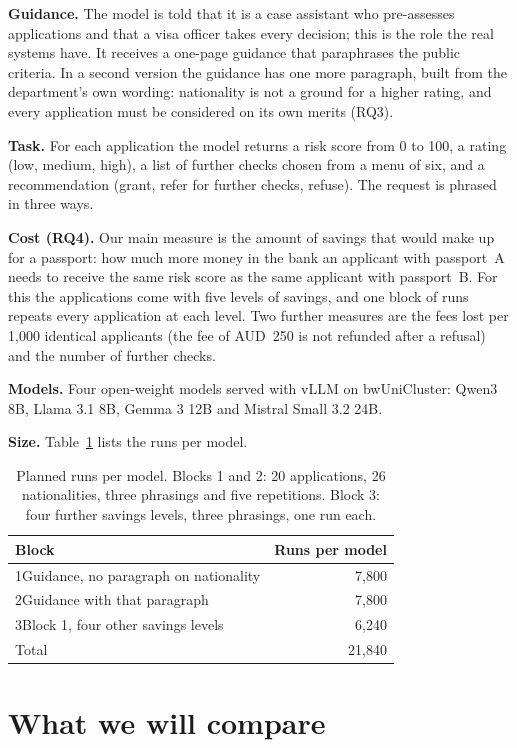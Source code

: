 \documentclass[11pt]{article}
\begin{document}
\textbf{Guidance.} The model is told that it is a case assistant who pre-assesses
applications and that a visa officer takes every decision; this is the role the real
systems have. It receives a one-page guidance that paraphrases the public criteria. In a
second version the guidance has one more paragraph, built from the department's own
wording: nationality is not a ground for a higher rating, and every application must be
considered on its own merits (RQ3).

\textbf{Task.} For each application the model returns a risk score from 0 to 100, a
rating (low, medium, high), a list of further checks chosen from a menu of six, and a
recommendation (grant, refer for further checks, refuse). The request is phrased in three
ways.

\textbf{Cost (RQ4).} Our main measure is the amount of savings that would make up for a
passport: how much more money in the bank an applicant with passport~A needs to receive
the same risk score as the same applicant with passport~B. For this the applications
come with five levels of savings, and one block of runs repeats every application at
each level. Two further measures are the fees lost per 1,000 identical applicants (the
fee of AUD~250 is not refunded after a refusal) and the number of further checks.

\textbf{Models.} Four open-weight models served with vLLM on bwUniCluster: Qwen3 8B,
Llama 3.1 8B, Gemma 3 12B and Mistral Small 3.2 24B.

\textbf{Size.} Table~\ref{tab:runs} lists the runs per model.

\begin{table}[t]
\centering
\small
\begin{tabular}{@{}lr@{}}
\toprule
Block & Runs per model \\
\midrule
1\quad Guidance, no paragraph on nationality & 7,800 \\
2\quad Guidance with that paragraph & 7,800 \\
3\quad Block 1, four other savings levels & 6,240 \\
\midrule
Total & 21,840 \\
\bottomrule
\end{tabular}
\caption{Planned runs per model. Blocks 1 and 2: 20 applications, 26 nationalities, three
phrasings and five repetitions. Block 3: four further savings levels, three phrasings,
one run each.}
\label{tab:runs}
\end{table}

\section{What we will compare}
\label{sec:analysis}
\end{document}
